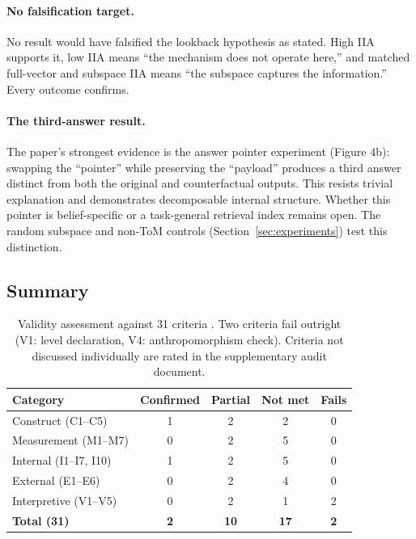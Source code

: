 \documentclass[11pt]{article}
\begin{document}
\paragraph{No falsification target.}
No result would have falsified the lookback hypothesis as stated. High IIA supports it, low IIA means ``the mechanism does not operate here,'' and matched full-vector and subspace IIA means ``the subspace captures the information.'' Every outcome confirms.

\paragraph{The third-answer result.}
The paper's strongest evidence is the answer pointer experiment (Figure 4b): swapping the ``pointer'' while preserving the ``payload'' produces a third answer distinct from both the original and counterfactual outputs. This resists trivial explanation and demonstrates decomposable internal structure. Whether this pointer is belief-specific or a task-general retrieval index remains open. The random subspace and non-ToM controls (Section~\ref{sec:experiments}) test this distinction.

\subsection{Summary}

\begin{table}[t]
\centering
\caption{Validity assessment against 31 criteria \citep{tower2026mechval}. Two criteria fail outright (V1: level declaration, V4: anthropomorphism check). Criteria not discussed individually are rated in the supplementary audit document.}
\label{tab:validity}
\begin{tabular}{lcccc}
\toprule
Category & Confirmed & Partial & Not met & Fails \\
\midrule
Construct (C1--C5) & 1 & 2 & 2 & 0 \\
Measurement (M1--M7) & 0 & 2 & 5 & 0 \\
Internal (I1--I7, I10) & 1 & 2 & 5 & 0 \\
External (E1--E6) & 0 & 2 & 4 & 0 \\
Interpretive (V1--V5) & 0 & 2 & 1 & 2 \\
\midrule
\textbf{Total (31)} & \textbf{2} & \textbf{10} & \textbf{17} & \textbf{2} \\
\bottomrule
\end{tabular}
\end{table}
\end{document}
